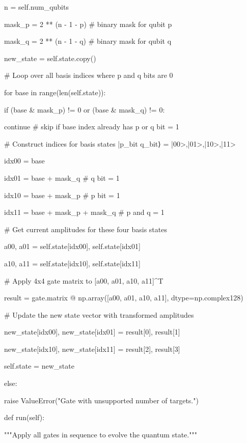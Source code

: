 \documentclass[%
oneside,                 %
final,                   %
10pt]{article}
\begin{document}
            n = self.num_qubits

            mask_p = 2 ** (n - 1 - p)  # binary mask for qubit p

            mask_q = 2 ** (n - 1 - q)  # binary mask for qubit q

            new_state = self.state.copy()

            # Loop over all basis indices where p and q bits are 0

            for base in range(len(self.state)):

                if (base & mask_p) != 0 or (base & mask_q) != 0:

                    continue  # skip if base index already has p or q bit = 1

                # Construct indices for basis states |p_bit q_bit⟩ = |00>,|01>,|10>,|11>

                idx00 = base

                idx01 = base + mask_q       # q bit = 1

                idx10 = base + mask_p       # p bit = 1

                idx11 = base + mask_p + mask_q  # p and q = 1

                # Get current amplitudes for these four basis states

                a00, a01 = self.state[idx00], self.state[idx01]

                a10, a11 = self.state[idx10], self.state[idx11]

                # Apply 4x4 gate matrix to [a00, a01, a10, a11]^T

                result = gate.matrix @ np.array([a00, a01, a10, a11], dtype=np.complex128)

                # Update the new state vector with transformed amplitudes

                new_state[idx00], new_state[idx01] = result[0], result[1]

                new_state[idx10], new_state[idx11] = result[2], result[3]

            self.state = new_state

        else:

            raise ValueError("Gate with unsupported number of targets.")



    def run(self):

        """Apply all gates in sequence to evolve the quantum state."""
\end{document}
